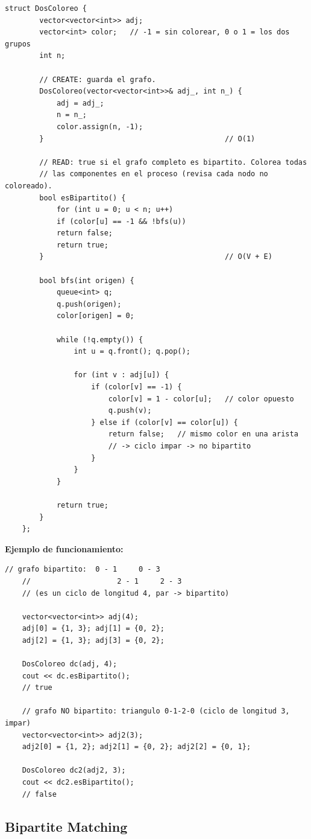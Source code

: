 \documentclass[10pt,a4paper,twocolumn]{article}
\begin{document}
\begin{lstlisting}[style=cpp]
	struct DosColoreo {
		vector<vector<int>> adj;
		vector<int> color;   // -1 = sin colorear, 0 o 1 = los dos grupos
		int n;
		
		// CREATE: guarda el grafo.
		DosColoreo(vector<vector<int>>& adj_, int n_) {
			adj = adj_;
			n = n_;
			color.assign(n, -1);
		}                                          // O(1)
		
		// READ: true si el grafo completo es bipartito. Colorea todas
		// las componentes en el proceso (revisa cada nodo no coloreado).
		bool esBipartito() {
			for (int u = 0; u < n; u++)
			if (color[u] == -1 && !bfs(u))
			return false;
			return true;
		}                                          // O(V + E)
		
		bool bfs(int origen) {
			queue<int> q;
			q.push(origen);
			color[origen] = 0;
			
			while (!q.empty()) {
				int u = q.front(); q.pop();
				
				for (int v : adj[u]) {
					if (color[v] == -1) {
						color[v] = 1 - color[u];   // color opuesto
						q.push(v);
					} else if (color[v] == color[u]) {
						return false;   // mismo color en una arista
						// -> ciclo impar -> no bipartito
					}
				}
			}
			
			return true;
		}
	};
\end{lstlisting}

\textbf{Ejemplo de funcionamiento:}

\begin{lstlisting}[style=cpp]
	// grafo bipartito:  0 - 1     0 - 3
	//                    2 - 1     2 - 3
	// (es un ciclo de longitud 4, par -> bipartito)
	
	vector<vector<int>> adj(4);
	adj[0] = {1, 3}; adj[1] = {0, 2};
	adj[2] = {1, 3}; adj[3] = {0, 2};
	
	DosColoreo dc(adj, 4);
	cout << dc.esBipartito();
	// true
	
	// grafo NO bipartito: triangulo 0-1-2-0 (ciclo de longitud 3, impar)
	vector<vector<int>> adj2(3);
	adj2[0] = {1, 2}; adj2[1] = {0, 2}; adj2[2] = {0, 1};
	
	DosColoreo dc2(adj2, 3);
	cout << dc2.esBipartito();
	// false
\end{lstlisting}


\subsection{Bipartite Matching}
\end{document}
